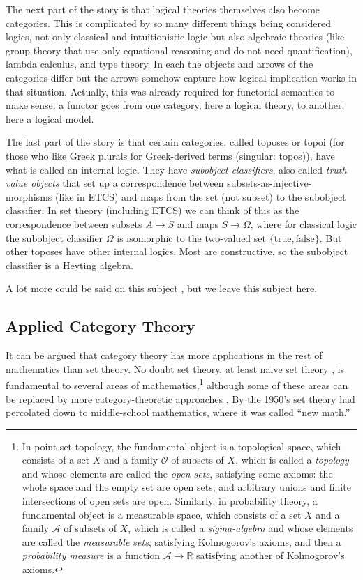 \documentclass[11pt]{article}
\newcommand{\real}{\mathbb{R}}
\begin{document}
The next part of the story is that logical theories themselves also
become categories.  This is complicated by so many different things being
considered logics, not only classical and intuitionistic logic but also
algebraic theories (like group theory that use only equational reasoning and
do not need quantification), lambda calculus, and type theory.  In each the
objects and arrows of the categories differ but the arrows somehow capture
how logical implication works in that situation.
Actually, this was already required for functorial semantics to make sense:
a functor goes from one category, here a logical theory, to another,
here a logical model.

The last part of the story is that certain categories, called toposes or
topoi (for those who like Greek plurals for Greek-derived terms
(singular: topos)),
have what is called an internal logic.  They have \emph{subobject classifiers},
also called \emph{truth value objects} that set up a correspondence between
subsets-as-injective-morphisms (like in ETCS) and maps from the set
(not subset) to the subobject classifier.  In set theory (including ETCS)
we can think of this as the correspondence between subsets $A \to S$ and
maps $S \to \Omega$, where for classical logic the subobject classifier
$\Omega$ is isomorphic to
the two-valued set $\{\text{true}, \text{false}\}$.  But other toposes have
other internal logics.  Most are constructive, so the subobject classifier
is a Heyting algebra.

A lot more could be said on this subject \citep{goldblatt}, but we
leave this subject here.

\subsection{Applied Category Theory}

It can be argued that category theory has more applications in the rest
of mathematics than set theory.  No doubt set theory, at least naive
set theory \citep{halmos}, is fundamental to several areas of
mathematics,\footnote{In point-set topology,
the fundamental object is a topological space, which
consists of a set $X$ and a family $\mathcal{O}$ of subsets of $X$,
which is called a \emph{topology} and whose elements
are called the \emph{open sets}, satisfying some axioms: the whole space
and the empty set are open sets, and arbitrary unions and finite intersections
of open sets are open.  Similarly, in probability theory, a fundamental object
is a measurable space, which
consists of a set $X$ and a family $\mathcal{A}$ of subsets of $X$,
which is called a \emph{sigma-algebra} and whose elements
are called the \emph{measurable sets}, satisfying Kolmogorov's axioms,
and then a \emph{probability measure} is a function $\mathcal{A} \to \real$
satisfying another of Kolmogorov's axioms.\label{foot:sigma-algebra}}
although some of these areas can be replaced by more category-theoretic
approaches \citep{johnstone}.
By the 1950's set theory had percolated down to middle-school mathematics,
where it was called ``new math.''
\end{document}

